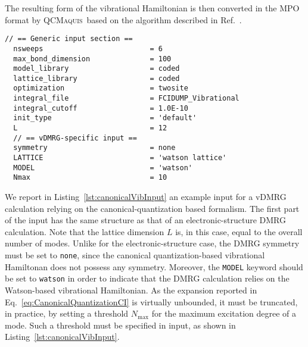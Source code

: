 \documentclass[bibliography=totoc,12pt,a4paper]{scrartcl}
\newcommand{\qcm}{\textsc{QCMaquis}}
\begin{document}
The resulting form of the vibrational Hamiltonian is then converted in the MPO format by \qcm\ based on the algorithm described in Ref.~. \\

\begin{lstlisting}[language=qcmaquis,
				   caption={Input example for a canonical quantization-based vDMRG-FCI calculation},
				   label=lst:canonicalVibInput]
  // == Generic input section ==
  nsweeps                         = 6
  max_bond_dimension              = 100
  model_library                   = coded
  lattice_library                 = coded
  optimization                    = twosite 
  integral_file                   = FCIDUMP_Vibrational
  integral_cutoff                 = 1.0E-10
  init_type                       = 'default'
  L                               = 12
  // == vDMRG-specific input ==
  symmetry                        = none
  LATTICE                         = 'watson lattice'
  MODEL                           = 'watson'
  Nmax                            = 10
\end{lstlisting}

We report in Listing~\ref{lst:canonicalVibInput} an example input for a vDMRG calculation relying on the canonical-quantization based formalism.
The first part of the input has the same structure as that of an electronic-structure DMRG calculation.
Note that the lattice dimension $L$ is, in this case, equal to the overall number of modes.
Unlike for the electronic-structure case, the DMRG symmetry must be set to \texttt{none}, since the canonical quantization-based vibrational Hamiltonan does not possess any symmetry.
Moreover, the \texttt{MODEL} keyword should be set to \texttt{watson} in order to indicate that the DMRG calculation relies on the Watson-based vibrational Hamiltonian.
As the expansion reported in Eq.~\ref{eq:CanonicalQuantizationCI} is virtually unbounded, it must be truncated, in practice, by setting a threshold $N_\text{max}$ for the maximum excitation degree of a mode.
Such a threshold must be specified in input, as shown in Listing~\ref{lst:canonicalVibInput}.
\end{document}
